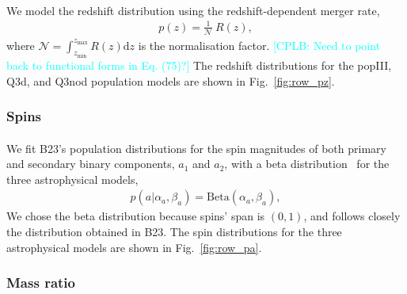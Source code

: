 \documentclass[a4paper,12pt]{article}
\newcommand{\cplb}[1]{\textcolor{cyan}{[CPLB: #1]}}
\begin{document}
\paragraph{}
We model the redshift distribution using the redshift-dependent merger rate,
\begin{align}
p(z) =
\frac{1}{\mathcal{N}}~R(z),
\label{eq:redshift_distr}
\end{align}
where $\mathcal{N}=\int_{z_{\mathrm{min}}}^{z_{\mathrm{max}}}R(z)\mathrm{d}z$ is the normalisation factor. 
\cplb{Need to point back to functional forms in Eq. (75)?}
The redshift distributions for the popIII, Q3d, and Q3nod population models are shown in Fig.~\ref{fig:row_pz}.
\\

\subsubsection{Spins}

\paragraph{}
We fit B23's population distributions for the spin magnitudes of both primary and secondary binary components, $a_1$ and $a_2$, with a beta distribution~\cite{wysocki2019reconstructing} for the three astrophysical models,
\begin{align}
p(a|\alpha_a,\beta_a) =
\mathrm{Beta} (\alpha_a, \beta_a),
\label{eq:spin_distr}
\end{align}
We chose the beta distribution because spins' span is $(0,1)$, and follows closely the distribution obtained in B23. The spin distributions for the three astrophysical models are shown in Fig.~\ref{fig:row_pa}.
\\

\subsubsection{Mass ratio}
\end{document}

